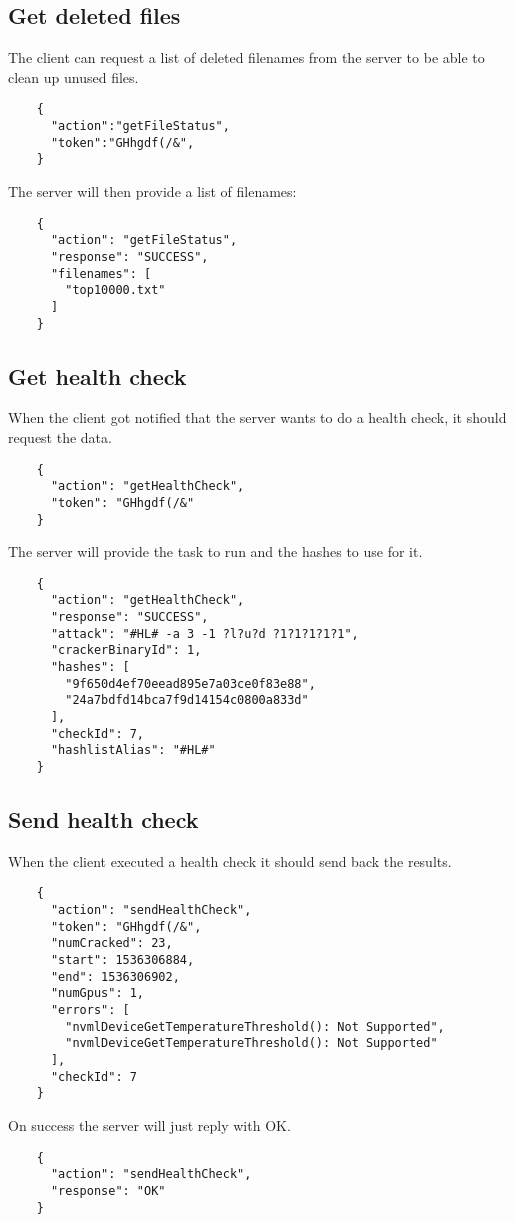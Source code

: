 \documentclass{article}
\begin{document}
	\subsection*{Get deleted files}
	The client can request a list of deleted filenames from the server to be able to clean up unused files.
	\begin{verbatim}
	{
	  "action":"getFileStatus",
	  "token":"GHhgdf(/&",
	}
	\end{verbatim}
	The server will then provide a list of filenames:
	\begin{verbatim}
	{
	  "action": "getFileStatus",
	  "response": "SUCCESS",
	  "filenames": [
	    "top10000.txt"
	  ]
	}
	\end{verbatim}
	
	\subsection*{Get health check}
	When the client got notified that the server wants to do a health check, it should request the data.
	\begin{verbatim}
	{
	  "action": "getHealthCheck", 
	  "token": "GHhgdf(/&"
	}
	\end{verbatim}
	The server will provide the task to run and the hashes to use for it.
	\begin{verbatim}
	{
	  "action": "getHealthCheck",
	  "response": "SUCCESS",
	  "attack": "#HL# -a 3 -1 ?l?u?d ?1?1?1?1?1",
	  "crackerBinaryId": 1,
	  "hashes": [
	    "9f650d4ef70eead895e7a03ce0f83e88",
	    "24a7bdfd14bca7f9d14154c0800a833d"
	  ],
	  "checkId": 7,
	  "hashlistAlias": "#HL#"
	}
	\end{verbatim}
	
	\subsection*{Send health check}
	When the client executed a health check it should send back the results.
	\begin{verbatim}
	{
	  "action": "sendHealthCheck", 
	  "token": "GHhgdf(/&", 
	  "numCracked": 23, 
	  "start": 1536306884, 
	  "end": 1536306902, 
	  "numGpus": 1, 
	  "errors": [
	    "nvmlDeviceGetTemperatureThreshold(): Not Supported", 
	    "nvmlDeviceGetTemperatureThreshold(): Not Supported"
	  ], 
	  "checkId": 7
	}
	\end{verbatim}
	On success the server will just reply with OK.
	\begin{verbatim}
	{
	  "action": "sendHealthCheck",
	  "response": "OK"
	}
	\end{verbatim}
\end{document}
